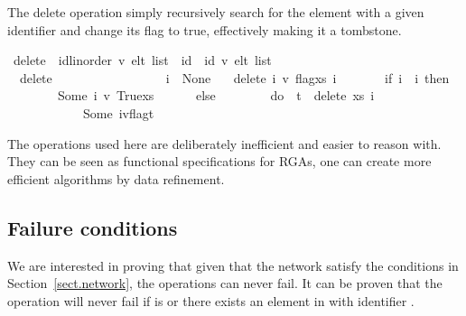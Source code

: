\documentclass[acmlarge,review,anonymous]{acmart}\settopmatter{printfolios=true}
\begin{document}
The delete operation simply recursively search for the element with a given
identifier and change its flag to true, effectively making it a tombstone.

\begin{isabellebody}
\isanewline
{}\isamarkupfalse%
\ delete\ {\isacharcolon}{\isacharcolon}\ {\isachardoublequoteopen}{\isacharparenleft}{\isacharprime}id{\isacharcolon}{\isacharcolon}{\isacharbraceleft}linorder{\isacharbraceright}{\isacharcomma}\ {\isacharprime}v{\isacharparenright}\ elt\ list\ {\isasymRightarrow}\ {\isacharprime}id\ {\isasymrightharpoonup}\ {\isacharparenleft}{\isacharprime}id{\isacharcomma}\ {\isacharprime}v{\isacharparenright}\ elt\ list{\isachardoublequoteclose}\ \isanewline
\ \ {\isachardoublequoteopen}delete\ {\isacharbrackleft}{\isacharbrackright}\ \ \ \ \ \ \ \ \ \ \ \ \ \ \ \ \ i\ {\isacharequal}\ None{\isachardoublequoteclose}\ {\isacharbar}\isanewline
\ \ {\isachardoublequoteopen}delete\ {\isacharparenleft}{\isacharparenleft}i{\isacharprime}{\isacharcomma}\ v{\isacharcomma}\ flag{\isacharparenright}{\isacharhash}xs{\isacharparenright}\ i\ {\isacharequal}\ \isanewline
\ \ \ \ \ {\isacharparenleft}if\ i{\isacharprime}\ {\isacharequal}\ i\ then\isanewline
\ \ \ \ \ \ \ \ Some\ {\isacharparenleft}{\isacharparenleft}i{\isacharprime}{\isacharcomma}\ v{\isacharcomma}\ True{\isacharparenright}{\isacharhash}xs{\isacharparenright}\isanewline
\ \ \ \ \ \ else\isanewline
\ \ \ \ \ \ \ \ do\ {\isacharbraceleft}\ t\ {\isasymleftarrow}\ delete\ xs\ i\isanewline
\ \ \ \ \ \ \ \ \ \ \ {\isacharsemicolon}\ Some\ {\isacharparenleft}{\isacharparenleft}i{\isacharprime}{\isacharcomma}v{\isacharcomma}flag{\isacharparenright}{\isacharhash}t{\isacharparenright}\isanewline
\ \ \ \ \ \ \ \ \ \ \ {\isacharbraceright}{\isacharparenright}{\isachardoublequoteclose}%
\isanewline
\end{isabellebody}

The operations used here are deliberately inefficient and easier to reason
with. They can be seen as functional specifications for RGAs, one can create
more efficient algorithms by data refinement.

\subsection{Failure conditions}

We are interested in proving that given that the network satisfy the conditions
in Section~\ref{sect.network}, the operations can never fail. It can be proven
that the operation  will never fail if  is
 or there exists an element in  with identifier .
\end{document}
